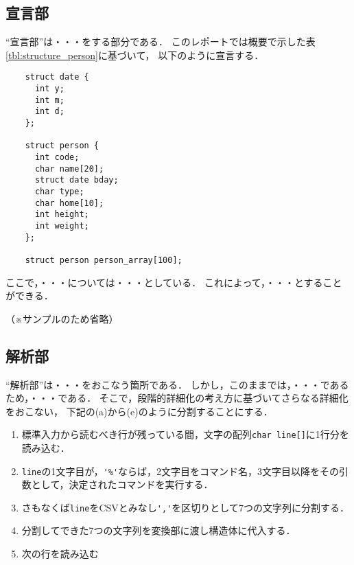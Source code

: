 \documentclass[a4j,11pt]{jarticle}
\begin{document}
\subsection{宣言部} \label{sec:declare}

``宣言部''は・・・をする部分である．
このレポートでは概要で示した表\ref{tbl:structure_person}に基づいて，
以下のように宣言する．

{\fontsize{10pt}{11pt} \selectfont
\begin{verbatim}
    struct date {
      int y;
      int m;
      int d;
    };
    
    struct person {
      int code;
      char name[20];
      struct date bday;
      char type;
      char home[10];
      int height;
      int weight;
    };
    
    struct person person_array[100];
\end{verbatim}
}

ここで，・・・については・・・としている．
これによって，・・・とすることができる．

（※サンプルのため省略）

\subsection{解析部} \label{sec:parse}

``解析部''は・・・をおこなう箇所である．
しかし，このままでは，・・・であるため，・・・である．
そこで，段階的詳細化の考え方に基づいてさらなる詳細化をおこない，
下記の(a)から(e)のように分割することにする．

\begin{enumerate}
\setlength{\parskip}{2pt} \setlength{\itemsep}{2pt}
\renewcommand{\labelenumi}{(\alph{enumi})} %
    \item 標準入力から読むべき行が残っている間，文字の配列\verb|char line[]|に1行分を読み込む．
    \item \verb|line|の1文字目が，\verb|'%'|ならば，2文字目をコマンド名，3文字目以降をその引数として，決定されたコマンドを実行する．
    \item さもなくば\verb|line|をCSVとみなし\verb|','|を区切りとして7つの文字列に分割する．
    \item 分割してできた7つの文字列を変換部に渡し構造体に代入する．
    \item 次の行を読み込む
\end{enumerate}
\end{document}
